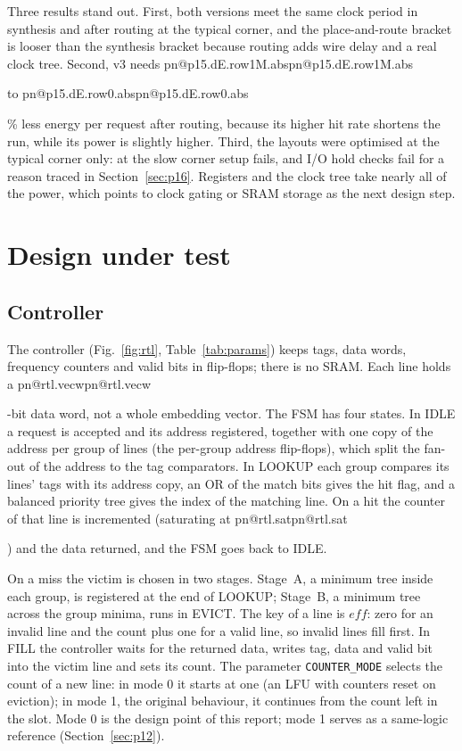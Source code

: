 \documentclass[11pt,a4paper]{article}
\makeatletter
\DeclareRobustCommand{\R}[1]{\ifcsname pn@#1\endcsname\csname pn@#1\endcsname\else
  \PackageError{synthesis report}{number key '#1' is not defined in macros.tex}{Run tools/make_paper_macros.py --target synth}\fi}
\makeatother
\begin{document}
Three results stand out. First, both versions meet the same clock period in synthesis and after routing at the
typical corner, and the place-and-route bracket is looser than the synthesis bracket because routing adds wire delay
and a real clock tree. Second, v3 needs \R{p15.dE.row1M.abs} to \R{p15.dE.row0.abs}\% less energy per request
after routing, because its higher hit rate shortens the run, while its power is slightly higher. Third, the layouts
were optimised at the typical corner only: at the slow corner setup fails, and I/O hold checks fail for a reason
traced in Section~\ref{sec:p16}. Registers and the clock tree take nearly all of the power, which points to clock
gating or SRAM storage as the next design step.

\section{Design under test}\label{sec:design}
\subsection{Controller}
The controller (Fig.~\ref{fig:rtl}, Table~\ref{tab:params}) keeps tags, data words, frequency counters and valid bits
in flip-flops; there is no SRAM. Each line holds a \R{rtl.vecw}-bit data word, not a whole embedding vector. The FSM
has four states. In IDLE a request is accepted and its address registered, together with one copy of the address per
group of lines (the per-group address flip-flops), which split the fan-out of the address to the tag comparators. In
LOOKUP each group compares its lines' tags with its address copy, an OR of the match bits gives the hit flag, and a
balanced priority tree gives the index of the matching line. On a hit the counter of that line is incremented
(saturating at \R{rtl.sat}) and the data returned, and the FSM goes back to IDLE.

On a miss the victim is chosen in two stages. Stage~A, a minimum tree inside each group, is registered at the end of
LOOKUP; Stage~B, a minimum tree across the group minima, runs in EVICT. The key of a line is
$\mathit{eff}$: zero for an invalid line and the count plus one for a valid line, so invalid lines fill first. In FILL
the controller waits for the returned data, writes tag, data and valid bit into the victim line and sets its count.
The parameter \texttt{COUNTER\_MODE} selects the count of a new line: in mode 0 it starts at one (an LFU with counters
reset on eviction); in mode 1, the original behaviour, it continues from the count left in the slot. Mode 0 is the
design point of this report; mode 1 serves as a same-logic reference (Section~\ref{sec:p12}).
\end{document}

